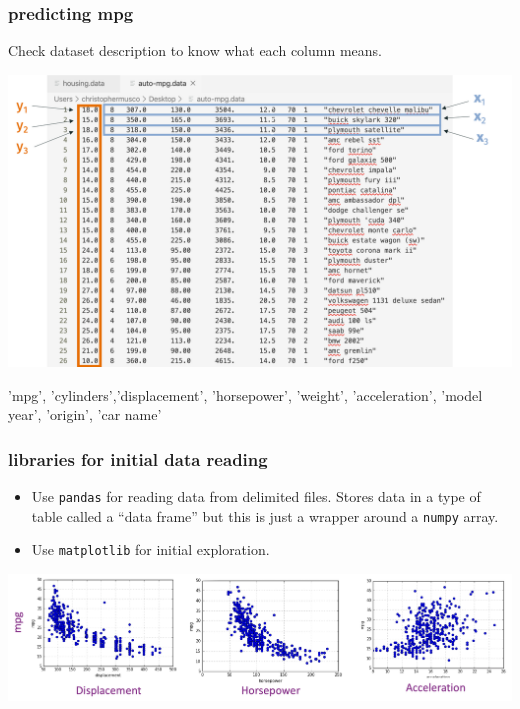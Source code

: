 \documentclass[handout,compress]{beamer}
\begin{document}
\begin{frame}
	\frametitle{predicting mpg}
	Check dataset description to know what each column means. 
	\begin{center}
		\includegraphics[width=.8\textwidth]{auto_data_marked.png}
		
		'mpg', 'cylinders','displacement', 'horsepower', 'weight', 'acceleration', 'model year', 'origin', 'car name'
	\end{center}
\end{frame}

\begin{frame}
	\frametitle{libraries for initial data reading}
	\begin{itemize}
		\item Use \texttt{pandas} for reading data from delimited files. Stores data in a type of table called a ``data frame'' but this is just a wrapper around a \texttt{numpy} array.
		\item Use \texttt{matplotlib} for initial exploration. 
	\end{itemize}
	\begin{center}
		\includegraphics[width=\textwidth]{mpg_plots.png}
	\end{center}
\end{frame}
\end{document}
